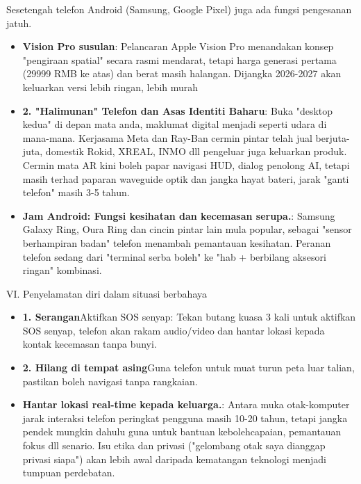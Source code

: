 


Sesetengah telefon Android (Samsung, Google Pixel) juga ada fungsi pengesanan jatuh.

\begin{itemize}
  \item \textbf{Vision Pro susulan}: Pelancaran Apple Vision Pro menandakan konsep "pengiraan spatial" secara rasmi mendarat, tetapi harga generasi pertama (29999 RMB ke atas) dan berat masih halangan. Dijangka 2026-2027 akan keluarkan versi lebih ringan, lebih murah
  \item \textbf{2. "Halimunan" Telefon dan Asas Identiti Baharu}: Buka "desktop kedua" di depan mata anda, maklumat digital menjadi seperti udara di mana-mana. Kerjasama Meta dan Ray-Ban cermin pintar telah jual berjuta-juta, domestik Rokid, XREAL, INMO dll pengeluar juga keluarkan produk. Cermin mata AR kini boleh papar navigasi HUD, dialog penolong AI, tetapi masih terhad paparan waveguide optik dan jangka hayat bateri, jarak "ganti telefon" masih 3-5 tahun.
  \item \textbf{Jam Android: Fungsi kesihatan dan kecemasan serupa.}: Samsung Galaxy Ring, Oura Ring dan cincin pintar lain mula popular, sebagai "sensor berhampiran badan" telefon menambah pemantauan kesihatan. Peranan telefon sedang dari "terminal serba boleh" ke "hab + berbilang aksesori ringan" kombinasi.
\end{itemize}


VI. Penyelamatan diri dalam situasi berbahaya

\begin{itemize}
  \item \textbf{1. Serangan}Aktifkan SOS senyap: Tekan butang kuasa 3 kali untuk aktifkan SOS senyap, telefon akan rakam audio/video dan hantar lokasi kepada kontak kecemasan tanpa bunyi.
  \item \textbf{2. Hilang di tempat asing}Guna telefon untuk muat turun peta luar talian, pastikan boleh navigasi tanpa rangkaian.
  \item \textbf{Hantar lokasi real-time kepada keluarga.}: Antara muka otak-komputer jarak interaksi telefon peringkat pengguna masih 10-20 tahun, tetapi jangka pendek mungkin dahulu guna untuk bantuan kebolehcapaian, pemantauan fokus dll senario. Isu etika dan privasi ("gelombang otak saya dianggap privasi siapa") akan lebih awal daripada kematangan teknologi menjadi tumpuan perdebatan.
\end{itemize}

